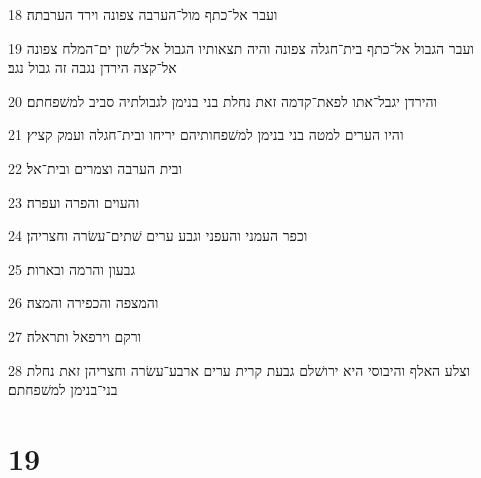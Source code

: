 \par 18 ועבר אל־כתף מול־הערבה צפונה וירד הערבתה׃
\par 19 ועבר הגבול אל־כתף בית־חגלה צפונה והיה תצאותיו הגבול אל־לשׁון ים־המלח צפונה אל־קצה הירדן נגבה זה גבול נגב׃
\par 20 והירדן יגבל־אתו לפאת־קדמה זאת נחלת בני בנימן לגבולתיה סביב למשׁפחתם׃
\par 21 והיו הערים למטה בני בנימן למשׁפחותיהם יריחו ובית־חגלה ועמק קציץ׃
\par 22 ובית הערבה וצמרים ובית־אל׃
\par 23 והעוים והפרה ועפרה׃
\par 24 וכפר העמני והעפני וגבע ערים שׁתים־עשׂרה וחצריהן׃
\par 25 גבעון והרמה ובארות׃
\par 26 והמצפה והכפירה והמצה׃
\par 27 ורקם וירפאל ותראלה׃
\par 28 וצלע האלף והיבוסי היא ירושׁלם גבעת קרית ערים ארבע־עשׂרה וחצריהן זאת נחלת בני־בנימן למשׁפחתם׃

\chapter{19}

